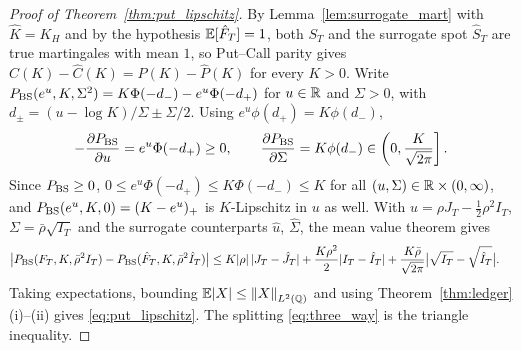 \begin{proof}[Proof of Theorem~\ref{thm:put_lipschitz}]
By Lemma~\ref{lem:surrogate_mart} with $\hat{K}=K_H$ and by the hypothesis $\mathbb{E}[\hat{F}_T]=1$, both $S_T$ and the surrogate spot $\hat{S}_T$ are true martingales with mean $1$, so Put--Call parity gives $C(K)-\hat{C}(K)=P(K)-\hat{P}(K)$ for every $K>0$. Write $P_{\mathrm{BS}}(e^u,K,\Sigma^2)=K\Phi(-d_-)-e^u\Phi(-d_+)$ for $u\in\mathbb{R}$ and $\Sigma>0$, with $d_\pm=(u-\log K)/\Sigma\pm\Sigma/2$. Using $e^u\phi(d_+)=K\phi(d_-)$,
\[
  \begin{gathered}
  -\frac{\partial P_{\mathrm{BS}}}{\partial u} = e^u\Phi(-d_+) \ge 0,
  \qquad
  \frac{\partial P_{\mathrm{BS}}}{\partial \Sigma} = K\phi(d_-) \in \left(0,\frac{K}{\sqrt{2\pi}}\right].
  \end{gathered}
\]
Since $P_{\mathrm{BS}}\ge0$, $0\le e^u\Phi(-d_+)\le K\Phi(-d_-)\le K$ for all $(u,\Sigma)\in\mathbb{R}\times(0,\infty)$, and $P_{\mathrm{BS}}(e^u,K,0)=(K-e^u)_+$ is $K$-Lipschitz in $u$ as well. With $u=\rho J_T-\tfrac12\rho^2 I_T$, $\Sigma=\bar{\rho}\sqrt{I_T}$ and the surrogate counterparts $\hat{u}$, $\hat{\Sigma}$, the mean value theorem gives
\[
  \begin{aligned}
  &\bigl|P_{\mathrm{BS}}(F_T,K,\bar{\rho}^2 I_T)-P_{\mathrm{BS}}(\hat{F}_T,K,\bar{\rho}^2\hat{I}_T)\bigr|
   \le K|\rho|\,|J_T-\hat{J}_T| + \frac{K\rho^2}{2}|I_T-\hat{I}_T|  + \frac{K\bar{\rho}}{\sqrt{2\pi}}\bigl|\sqrt{I_T}-\sqrt{\hat{I}_T}\bigr|.
  \end{aligned}
\]
Taking expectations, bounding $\mathbb{E}|X|\le\left\lVert X\right\rVert_{L^2(\mathbb{Q})}$ and using Theorem~\ref{thm:ledger}(i)--(ii) gives \eqref{eq:put_lipschitz}. The splitting \eqref{eq:three_way} is the triangle inequality.
\end{proof}

